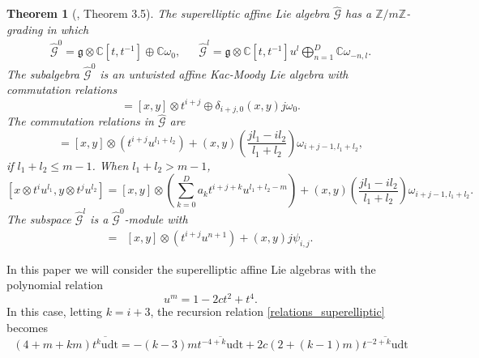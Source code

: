 \documentclass[review,nopreprintline]{elsarticle}
\newtheorem{theorem}{Theorem}[section]
\theoremstyle{definition}
\numberwithin{equation}{section}
\theoremstyle{remark}
\newcommand{\fg}{\mathfrak{g}}
\newcommand{\ot}{\otimes}
\newcommand{\Cx}{\mathbb{C}}
\begin{document}
	    \begin{theorem}[\cite{AlbinodosSantos2021OnAlgebras}, Theorem 3.5]\label{corollary}
	            The superelliptic affine Lie algebra $\hat{\mathcal{G}}$ has a $\mathbb{Z}/m\mathbb{Z}$-grading in which
	        \begin{align*}
	            \hat{\mathcal{G}}^0=\fg\ot\Cx[t,t^{-1}]\oplus \Cx\omega_0,&& 
	            \hat{\mathcal{G}}^l=\fg\ot\Cx[t,t^{-1}]u^l\bigoplus_{n=1}^D \Cx\omega_{-n,l}.
	        \end{align*}
	        The subalgebra $\hat{\mathcal{G}}^0$ is an untwisted affine Kac-Moody Lie algebra with commutation relations
	        \begin{equation*}
	            [x\ot t^i,y\ot t^j]=[x,y]\ot t^{i+j}\oplus \delta_{i+j,0}(x,y)j\omega_0.
	        \end{equation*}
	        The commutation relations in $\mathcal{\hat{G}}$ are
	        \begin{equation*}
	            [x\ot t^iu^{l_1},y\ot t^ju^{l_2}]=[x,y]\ot (t^{i+j}u^{l_1+l_2})+(x,y)\left(\frac{jl_1-il_2}{l_1+l_2}\right) \omega_{i+j-1,l_1+l_2}, 
	        \end{equation*}
	        if $l_1+l_2\leq m-1$. When $l_1+l_2>m-1$,
	        \begin{equation*}
	            {}[x\ot t^iu^{l_1},y\ot t^ju^{l_2}]=[x,y]\ot \left(\sum_{k=0}^D a_kt^{i+j+k}u^{l_1+l_2-m}\right)+(x,y)\left(\frac{jl_1-il_2}{l_1+l_2}\right) \omega_{i+j-1,l_1+l_2}.
	        \end{equation*}
	        The subspace $\mathcal{\hat{G}}^l$ is a $\mathcal{\hat{G}}^0$-module with 
	        \begin{align}
	            [x\ot t^iu^n,y\ot t^j]=&[x,y]\ot (t^{i+j}u^{n+1})+(x,y)j\psi_{i,j}.
	        \end{align}
	    \end{theorem}
	  
	      In this paper we will consider the superelliptic affine Lie algebras with the polynomial relation $$u^m=1-2 c t^2+t^4.$$ In this case, letting $k=i+3$, the recursion relation \eqref{relations_superelliptic} becomes 
	    \begin{equation*}
	        (4+m+k m) \overline{t^k \text{udt}}=-(k-3) m \overline{t^{-4+k} \text{udt}}+2 c (2+(k-1) m) \overline{t^{-2+k} \text{udt}}
	    \end{equation*}
	    
\end{document}
